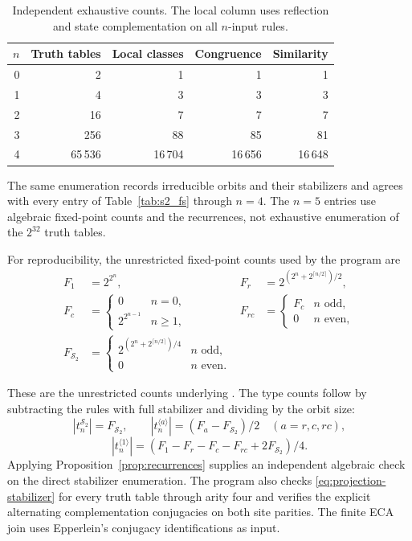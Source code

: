 \documentclass[11pt,a4paper]{article}
\newenvironment{revision}{\color{blue}}{}
\newenvironment{revision}{\color{black}}{}
\begin{document}
\begin{revision}
\begin{table}[htbp]
\begin{revision}
\centering
\caption{Independent exhaustive counts. The local column uses
reflection and state complementation on all $n$-input rules.}
\label{tab:verification}
\begin{tabular}{r|r|r|r|r}
$n$ & Truth tables & Local classes & Congruence & Similarity\\\hline
0 & 2 & 1 & 1 & 1\\
1 & 4 & 3 & 3 & 3\\
2 & 16 & 7 & 7 & 7\\
3 & 256 & 88 & 85 & 81\\
4 & 65\,536 & 16\,704 & 16\,656 & 16\,648
\end{tabular}
\par
\end{revision}
\end{table}
The same enumeration records irreducible orbits and their stabilizers
and agrees with every entry of Table~\ref{tab:s2_fs} through $n=4$.
The $n=5$ entries use algebraic fixed-point counts and the recurrences,
not exhaustive enumeration of the $2^{32}$ truth tables.

\begin{samepage}
For reproducibility, the unrestricted fixed-point counts used by the
program are
\[
\begin{aligned}
F_1&=2^{2^n}, &
F_r&=2^{(2^n+2^{\lceil n/2\rceil})/2},\\
F_c&=\begin{cases}0&n=0,\\2^{2^{n-1}}&n\geq1,\end{cases} &
F_{rc}&=\begin{cases}F_c&n\text{ odd},\\0&n\text{ even},\end{cases}\\
F_{\mathcal S_2}&=
\begin{cases}2^{(2^n+2^{\lceil n/2\rceil})/4}&n\text{ odd},\\
0&n\text{ even}.
\end{cases}
\end{aligned}
\]
\end{samepage}
These are the unrestricted counts underlying
\cite{SCHALLER2025100298}. The type counts follow by subtracting the
rules with full stabilizer and dividing by the orbit size:
\[
|t_n^{\mathcal S_2}|=F_{\mathcal S_2},\qquad
|t_n^{\langle a\rangle}|=(F_a-F_{\mathcal S_2})/2
\quad(a=r,c,rc),
\]
\[
|t_n^{\langle1\rangle}|
=(F_1-F_r-F_c-F_{rc}+2F_{\mathcal S_2})/4.
\]
Applying Proposition~\ref{prop:recurrences} supplies an independent
algebraic check on the direct stabilizer enumeration.
The program also checks \eqref{eq:projection-stabilizer} for every
truth table through arity four and verifies the explicit alternating
complementation conjugacies on both site parities. The finite ECA join
uses Epperlein's conjugacy identifications as input.


\end{revision}
\end{document}
